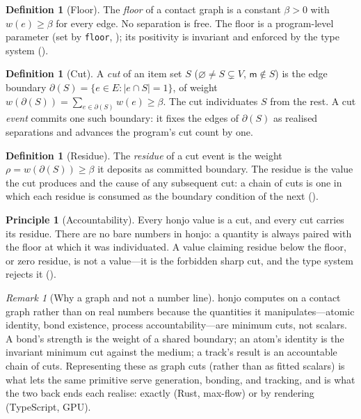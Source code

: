 \documentclass[11pt,a4paper]{article}
\theoremstyle{thmstyle}
\theoremstyle{definition}
\newtheorem{definition}[theorem]{Definition}
\newtheorem{principle}[theorem]{Principle}
\theoremstyle{remark}
\newtheorem{remark}[theorem]{Remark}
\newcommand{\flo}{\beta}
\newcommand{\res}{\rho}
\newcommand{\cut}{\partial}
\newcommand{\medium}{\mathsf{m}}
\newcommand{\hj}[1]{\texttt{#1}}
\newcommand{\abs}[1]{\lvert#1\rvert}
\begin{document}
\begin{definition}[Floor]
\label{def:floor}
The \emph{floor} of a contact graph is a constant $\flo>0$ with
$w(e)\ge\flo$ for every edge. No separation is free. The floor is a
program-level parameter (set by \hj{floor}, ); its
positivity is invariant and enforced by the type system
().
\end{definition}

\begin{definition}[Cut]
\label{def:cut}
A \emph{cut} of an item set $S$ ($\varnothing\neq S\subsetneq V$,
$\medium\notin S$) is the edge boundary
$\cut(S)=\{e\in E: \abs{e\cap S}=1\}$, of weight
$w(\cut(S))=\sum_{e\in\cut(S)}w(e)\ge\flo$. The cut individuates $S$ from
the rest. A cut \emph{event} commits one such boundary: it fixes the
edges of $\cut(S)$ as realised separations and advances the program's
cut count by one.
\end{definition}

\begin{definition}[Residue]
\label{def:residue}
The \emph{residue} of a cut event is the weight $\res=w(\cut(S))\ge\flo$
it deposits as committed boundary. The residue is the value the cut
produces and the cause of any subsequent cut: a chain of cuts is one in
which each residue is consumed as the boundary condition of the next
().
\end{definition}

\begin{principle}[Accountability]
\label{prin:accountability}
Every honjo value is a cut, and every cut carries its residue. There are
no bare numbers in honjo: a quantity is always paired with the floor at
which it was individuated. A value claiming residue below the floor, or
zero residue, is not a value---it is the forbidden sharp cut, and the
type system rejects it ().
\end{principle}

\begin{remark}[Why a graph and not a number line]
\label{rem:why-graph}
honjo computes on a contact graph rather than on real numbers because the
quantities it manipulates---atomic identity, bond existence, process
accountability---are minimum cuts, not scalars. A bond's strength is the
weight of a shared boundary; an atom's identity is the invariant minimum
cut against the medium; a track's result is an accountable chain of cuts.
Representing these as graph cuts (rather than as fitted scalars) is what
lets the same primitive serve generation, bonding, and tracking, and is
what the two back ends each realise: exactly (Rust, max-flow) or by
rendering (TypeScript, GPU).
\end{remark}
\end{document}
